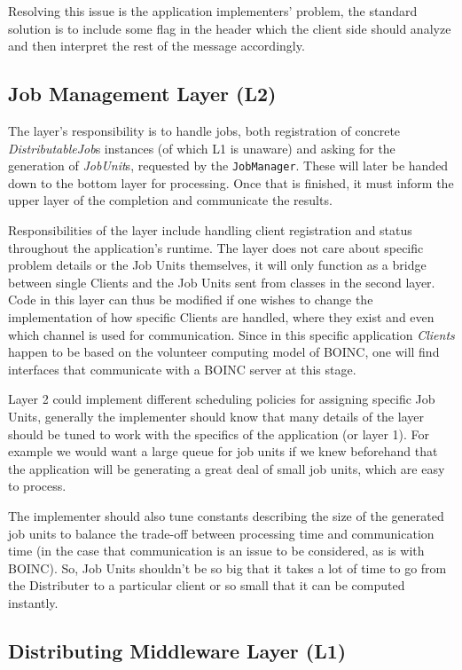\documentclass[a4paper,12pt,english]{report}
\newcommand{\JM}{\texttt{JobManager}}
\begin{document}
Resolving this issue is the application implementers' problem, the standard solution is to include some flag in the header which the client side should analyze and then interpret the rest of the message accordingly.

\subsection{Job Management Layer (L2)}

The layer's responsibility is to handle jobs, both registration of concrete \emph{DistributableJob}s instances (of which L1 is unaware) and asking for the generation of \emph{JobUnit}s, requested by the \JM. These will later be handed down to the bottom layer for processing. Once that is finished, it must inform the upper layer of the completion and communicate the results.

Responsibilities of the layer include handling client registration and status throughout the application's runtime. The layer does not care about specific problem details or the Job Units themselves, it will only function as a bridge between single Clients and the Job Units sent from classes in the second layer. Code in this layer can thus be modified if one wishes to change the implementation of how specific Clients are handled, where they exist and even which channel is used for communication. Since in this specific application \emph{Clients} happen to be based on the volunteer computing model of BOINC, one will find interfaces that communicate with a BOINC server at this stage.

Layer 2 could implement different scheduling policies for assigning specific Job Units, generally the implementer should know that many details of the layer should be tuned to work with the specifics of the application (or layer 1). For example we would want a large queue for job units if we knew beforehand that the application will be generating a great deal of small job units, which are easy to process. 

The implementer should also tune constants describing the size of the generated job units to balance the trade-off between processing time and communication time (in the case that communication is an issue to be considered, as is with BOINC). So, Job Units shouldn't be so big that it takes a lot of time to go from the Distributer to a particular client or so small that it can be computed instantly. 

\subsection{Distributing Middleware Layer (L1)}
\end{document}
